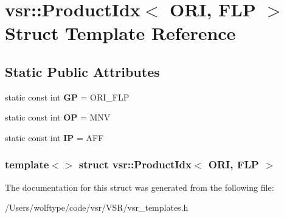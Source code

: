 \hypertarget{structvsr_1_1_product_idx_3_01_o_r_i_00_01_f_l_p_01_4}{\section{vsr\-:\-:Product\-Idx$<$ O\-R\-I, F\-L\-P $>$ Struct Template Reference}
\label{structvsr_1_1_product_idx_3_01_o_r_i_00_01_f_l_p_01_4}
}
\subsection*{Static Public Attributes}
\begin{DoxyCompactItemize}
\item 
\hypertarget{structvsr_1_1_product_idx_3_01_o_r_i_00_01_f_l_p_01_4_a75852c59c8cef48d905ab7550c7e03a6}{static const int {\bfseries G\-P} = O\-R\-I\-\_\-\-F\-L\-P}\label{structvsr_1_1_product_idx_3_01_o_r_i_00_01_f_l_p_01_4_a75852c59c8cef48d905ab7550c7e03a6}

\item 
\hypertarget{structvsr_1_1_product_idx_3_01_o_r_i_00_01_f_l_p_01_4_a0e9b7013e61f877dc613314f6a595c09}{static const int {\bfseries O\-P} = M\-N\-V}\label{structvsr_1_1_product_idx_3_01_o_r_i_00_01_f_l_p_01_4_a0e9b7013e61f877dc613314f6a595c09}

\item 
\hypertarget{structvsr_1_1_product_idx_3_01_o_r_i_00_01_f_l_p_01_4_ab6e89d7538b0d9e2b6b0c38487866f61}{static const int {\bfseries I\-P} = A\-F\-F}\label{structvsr_1_1_product_idx_3_01_o_r_i_00_01_f_l_p_01_4_ab6e89d7538b0d9e2b6b0c38487866f61}

\end{DoxyCompactItemize}
\subsubsection*{template$<$$>$ struct vsr\-::\-Product\-Idx$<$ O\-R\-I, F\-L\-P $>$}



The documentation for this struct was generated from the following file\-:\begin{DoxyCompactItemize}
\item 
/\-Users/wolftype/code/vsr/\-V\-S\-R/vsr\-\_\-templates.\-h\end{DoxyCompactItemize}
